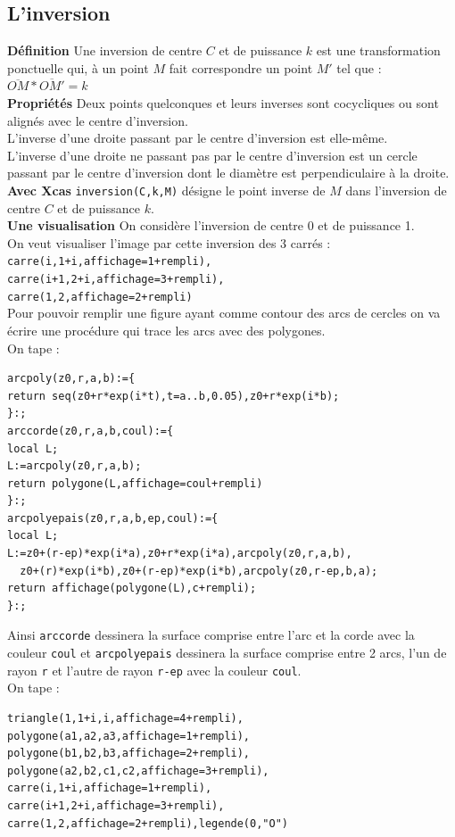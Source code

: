 \documentclass[a4paper,11pt]{book}
\begin{document}
\subsection{L'inversion}
{\bf D\'efinition}
Une inversion de centre $C$ et de puissance $k$ est une transformation 
ponctuelle qui, \`a un point $M$ fait correspondre un point $M'$ tel que :\\
$\overline{OM}*\overline{OM'}=k$\\
{\bf Propri\'et\'es} 
Deux points quelconques et leurs inverses sont cocycliques ou sont align\'es 
avec le centre d'inversion.\\
L'inverse d'une droite passant par le centre d'inversion est elle-m\^eme.\\
L'inverse d'une droite ne passant pas par le centre d'inversion est un cercle
passant par le centre d'inversion dont le diam\`etre est perpendiculaire \`a
la droite.\\
{\bf Avec Xcas}
{\tt inversion(C,k,M)} d\'esigne le point inverse de $M$ dans l'inversion de 
centre $C$ et de puissance $k$.\\
{\bf Une visualisation}
On consid\`ere l'inversion de centre 0 et de puissance 1.\\
On veut visualiser l'image par cette inversion des 3 carr\'es :\\
{\tt carre(i,1+i,affichage=1+rempli),\\
 carre(i+1,2+i,affichage=3+rempli),\\
 carre(1,2,affichage=2+rempli)}\\
Pour pouvoir remplir une figure ayant comme contour des arcs de cercles on va
\'ecrire une proc\'edure qui trace les arcs avec des polygones.\\
On tape :
\begin{verbatim}
arcpoly(z0,r,a,b):={
return seq(z0+r*exp(i*t),t=a..b,0.05),z0+r*exp(i*b);
}:;
arccorde(z0,r,a,b,coul):={
local L;
L:=arcpoly(z0,r,a,b);
return polygone(L,affichage=coul+rempli)
}:;
arcpolyepais(z0,r,a,b,ep,coul):={
local L;  
L:=z0+(r-ep)*exp(i*a),z0+r*exp(i*a),arcpoly(z0,r,a,b),
  z0+(r)*exp(i*b),z0+(r-ep)*exp(i*b),arcpoly(z0,r-ep,b,a);
return affichage(polygone(L),c+rempli);
}:;  
\end{verbatim} 
Ainsi {\tt arccorde} dessinera la surface comprise entre l'arc et la corde avec
la couleur {\tt coul} et {\tt arcpolyepais} dessinera la surface comprise entre 
2 arcs, l'un de rayon {\tt r} et l'autre de rayon {\tt r-ep} avec la couleur 
{\tt coul}.\\
On tape :
\begin{verbatim}
triangle(1,1+i,i,affichage=4+rempli),
polygone(a1,a2,a3,affichage=1+rempli),
polygone(b1,b2,b3,affichage=2+rempli),
polygone(a2,b2,c1,c2,affichage=3+rempli),
carre(i,1+i,affichage=1+rempli),
carre(i+1,2+i,affichage=3+rempli),
carre(1,2,affichage=2+rempli),legende(0,"O")
\end{verbatim} 
\end{document}
